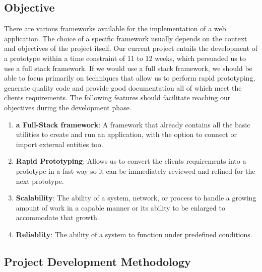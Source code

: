 \subsection{Objective}
There are various frameworks available for the implementation of a web application. The choice of a specific framework usually depends on the context and objectives of the project itself. Our current project entails the development of a prototype within a time constraint of 11 to 12 weeks, which persuaded us to use a full stack framework. If we would use a full stack framework, we should be able to focus primarily on techniques that allow us to perform rapid prototyping, generate quality code and provide good documentation all of which meet the clients requirements. The following features should facilitate reaching our objectives during the development phase.

\begin{enumerate}
	\item \textbf{a Full-Stack framework}: A framework that already contains all the basic utilities to create and run an application, with the option to connect or import external entities too.
	\item \textbf{Rapid Prototyping}: Allows us to convert the clients requirements into a prototype in a fast way so it can be immediately reviewed and refined for the next prototype.
	\item \textbf{Scalability}: The ability of a system, network, or process to handle a growing amount of work in a capable manner or its ability to be enlarged to accommodate that growth.\cite{wiki:scalability}
	\item \textbf{Reliablity}: The ability of a system to function under predefined conditions.
\end{enumerate}
\subsection{Project Development Methodology} %

